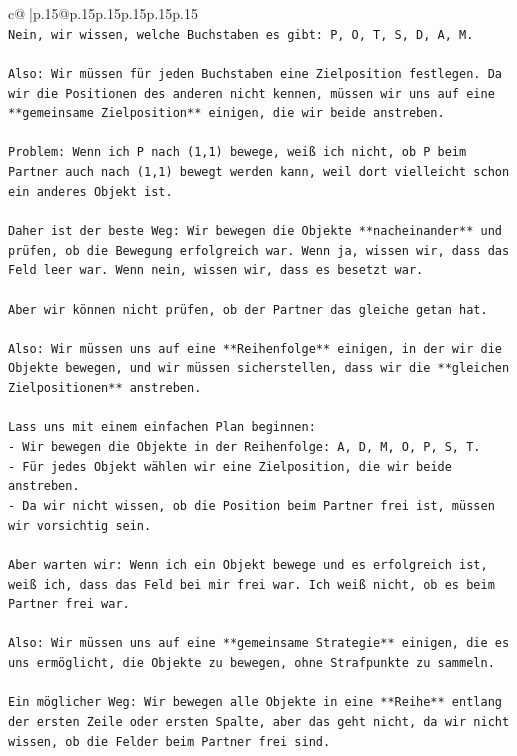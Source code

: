 \documentclass{article}
\begin{document}
{\begin{supertabular}{c@{$\;$}|p{.15\linewidth}@{}p{.15\linewidth}p{.15\linewidth}p{.15\linewidth}p{.15\linewidth}p{.15\linewidth}}
{{{\\ 
\texttt{Nein, wir wissen, welche Buchstaben es gibt: P, O, T, S, D, A, M.} \\
\\ 
\texttt{Also: Wir müssen für jeden Buchstaben eine Zielposition festlegen. Da wir die Positionen des anderen nicht kennen, müssen wir uns auf eine **gemeinsame Zielposition** einigen, die wir beide anstreben.} \\
\\ 
\texttt{Problem: Wenn ich P nach (1,1) bewege, weiß ich nicht, ob P beim Partner auch nach (1,1) bewegt werden kann, weil dort vielleicht schon ein anderes Objekt ist.} \\
\\ 
\texttt{Daher ist der beste Weg: Wir bewegen die Objekte **nacheinander** und prüfen, ob die Bewegung erfolgreich war. Wenn ja, wissen wir, dass das Feld leer war. Wenn nein, wissen wir, dass es besetzt war.} \\
\\ 
\texttt{Aber wir können nicht prüfen, ob der Partner das gleiche getan hat.} \\
\\ 
\texttt{Also: Wir müssen uns auf eine **Reihenfolge** einigen, in der wir die Objekte bewegen, und wir müssen sicherstellen, dass wir die **gleichen Zielpositionen** anstreben.} \\
\\ 
\texttt{Lass uns mit einem einfachen Plan beginnen:} \\
\texttt{{-} Wir bewegen die Objekte in der Reihenfolge: A, D, M, O, P, S, T.} \\
\texttt{{-} Für jedes Objekt wählen wir eine Zielposition, die wir beide anstreben.} \\
\texttt{{-} Da wir nicht wissen, ob die Position beim Partner frei ist, müssen wir vorsichtig sein.} \\
\\ 
\texttt{Aber warten wir: Wenn ich ein Objekt bewege und es erfolgreich ist, weiß ich, dass das Feld bei mir frei war. Ich weiß nicht, ob es beim Partner frei war.} \\
\\ 
\texttt{Also: Wir müssen uns auf eine **gemeinsame Strategie** einigen, die es uns ermöglicht, die Objekte zu bewegen, ohne Strafpunkte zu sammeln.} \\
\\ 
\texttt{Ein möglicher Weg: Wir bewegen alle Objekte in eine **Reihe** entlang der ersten Zeile oder ersten Spalte, aber das geht nicht, da wir nicht wissen, ob die Felder beim Partner frei sind.} \\
}}}
\end{supertabular}}
\end{document}
